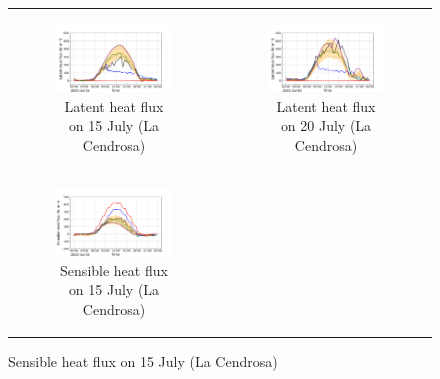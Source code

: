 \begin{figure}[hbtp]
    \centering
    \begin{tabular}{cc}
        \begin{subfigure}[t]{0.5\textwidth}
            \caption{Latent heat flux on 15 July (La Cendrosa)}
            \includegraphics[width=\textwidth]{images/chap5/IOP_TS/TS_2021-07-15_cendrosa_flat.png}
        \end{subfigure} &
        \begin{subfigure}[t]{0.5\textwidth}
            \caption{Latent heat flux on 20 July (La Cendrosa)}
            \includegraphics[width=\textwidth]{images/chap5/IOP_TS/TS_2021-07-20_cendrosa_flat.png}
        \end{subfigure} \\
        \begin{subfigure}[t]{0.5\textwidth}
            \caption{Sensible heat flux on 15 July (La Cendrosa)}
            \includegraphics[width=\textwidth]{images/chap5/IOP_TS/TS_2021-07-15_cendrosa_sens.png}

\end{subfigure}
\end{tabular}
\end{figure}
